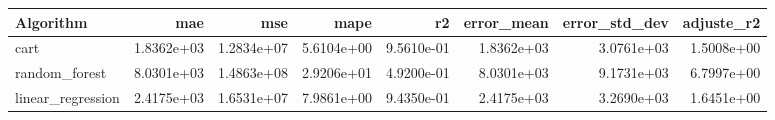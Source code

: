 \begin{tabular}{lrrrrrrr}
\toprule
Algorithm & mae & mse & mape & r2 & error_mean & error_std_dev & adjuste_r2 \\
\midrule
cart & 1.8362e+03 & 1.2834e+07 & 5.6104e+00 & 9.5610e-01 & 1.8362e+03 & 3.0761e+03 & 1.5008e+00 \\
random_forest & 8.0301e+03 & 1.4863e+08 & 2.9206e+01 & 4.9200e-01 & 8.0301e+03 & 9.1731e+03 & 6.7997e+00 \\
linear_regression & 2.4175e+03 & 1.6531e+07 & 7.9861e+00 & 9.4350e-01 & 2.4175e+03 & 3.2690e+03 & 1.6451e+00 \\
\bottomrule
\end{tabular}
